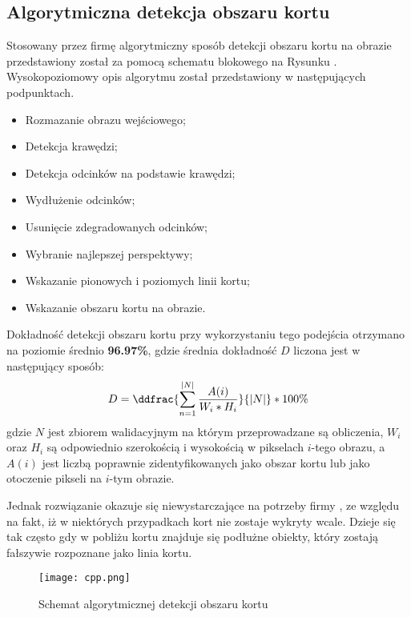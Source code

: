 \subsection{Algorytmiczna detekcja obszaru kortu}
\label{sec:aglorytmiczna_detekcja}

Stosowany przez firmę \blue{} algorytmiczny sposób detekcji obszaru kortu na obrazie przedstawiony został za pomocą schematu blokowego na Rysunku . Wysokopoziomowy opis algorytmu został przedstawiony w następujących podpunktach.

\begin{itemize}
  \item Rozmazanie obrazu wejściowego;
  \item Detekcja krawędzi;
  \item Detekcja odcinków na podstawie krawędzi;
  \item Wydłużenie odcinków;
  \item Usunięcie zdegradowanych odcinków;
  \item Wybranie najlepszej perspektywy;
  \item Wskazanie pionowych i poziomych linii kortu;
  \item Wskazanie obszaru kortu na obrazie.
\end{itemize}

Dokładność detekcji obszaru kortu przy wykorzystaniu tego podejścia otrzymano na poziomie średnio \textbf{96.97\%}, gdzie średnia dokładność $D$ liczona jest w następujący sposób:
\vspace{-3pt} 
\[
\vspace{-3pt}
D = \ddfrac{\sum_{n = 1}^{|N|} \frac{A(i)}{W_{i} * H_{i}}}{|N|} * 100\%
\vspace{-3pt}
\]
gdzie $N$ jest zbiorem walidacyjnym na którym przeprowadzane są obliczenia, $W_{i}$ oraz $H_{i}$ są odpowiednio szerokością i wysokością w pikselach $i$-tego obrazu, a $A(i)$ jest liczbą poprawnie zidentyfikowanych jako obszar kortu lub jako otoczenie pikseli na $i$-tym obrazie.

Jednak rozwiązanie okazuje się niewystarczające na potrzeby firmy \blue{}, ze względu na fakt, iż w niektórych przypadkach kort nie zostaje wykryty wcale. Dzieje się tak często gdy w pobliżu kortu znajduje się podłużne obiekty, który zostają fałszywie rozpoznane jako linia kortu.

\begin{figure}[h]
  \centering
  \caption{Schemat algorytmicznej detekcji obszaru kortu}
  \texttt{[image: cpp.png]}
  \label{fig:algcpp}
\end{figure}
